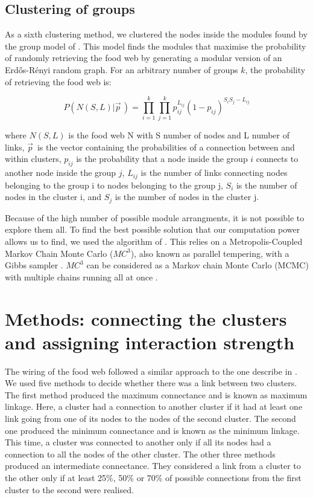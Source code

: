 \documentclass[twocolumn]{article}
\begin{document}
	\subsection*{Clustering of groups}

		As a sixth clustering method, we clustered the nodes inside the modules found by the group model of \citep{Allesina2009a}. This model finds the modules that maximise the probability of randomly retrieving the food web by generating a modular version of an Erdős-Rényi random graph. For an arbitrary number of groups $k$, the probability of retrieving the food web is:

				\begin{equation}
					P(N(S,L)|\vec{p}^{\,})=\prod_{i=1}^k\prod_{j=1}^k p_{ij}^{L_{ij}} (1-p_{ij})^{S_i S_j - L_{ij}}
				\end{equation}

		\noindent where $N(S,L)$ is the food web N with S number of nodes and L number of links,  $\vec{p}^{\,}$ is the vector containing the probabilities of a connection between and within clusters, $p_{ij}$ is the probability that a node inside the group $i$ connects to another node inside the group $j$, $L_{ij}$ is the number of links connecting nodes belonging to the group i to nodes belonging to the group j, $S_i$ is the number of nodes in the cluster i,  and $S_j$ is the number of nodes in the cluster j.

		Because of the high number of possible module arrangments, it is not possible to explore them all. To find the best possible solution that our computation power allows us to find, we used the algorithm of \citet{Sander2015}. This relies on a Metropolis-Coupled Markov Chain Monte Carlo ($MC^3$), also known as parallel tempering\citep{Geyer1991}, with a Gibbs sampler \citep{Yildirim2012}. $MC^3$ can be considered as a Markov chain Monte Carlo (MCMC) with multiple chains running all at once \citep{Sander2015}.

\section*{Methods: connecting the clusters and assigning interaction strength}

	The wiring of the food web followed a similar approach to the one describe in \citet{Martinez1991}. We used five methods to decide whether there was a link between two clusters. The first method produced the maximum connectance and is known as maximum linkage. Here, a cluster had a connection to another cluster if it had at least one link going from one of its nodes to the nodes of the second cluster. The second one produced the minimum connectance and is known as the minimum linkage. This time, a cluster was connected to another only if all its nodes had a connection to all the nodes of the other cluster. The other three methods produced an intermediate connectance. They considered a link from a cluster to the other only if at least 25\%, 50\% or 70\% of possible connections from the first cluster to the second were realised.
\end{document}
